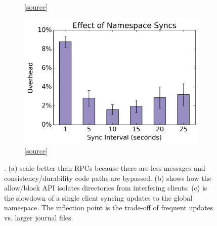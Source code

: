 \begin{figure}[tb]
\begin{subfigure}[b]{.3\linewidth}
      \caption{
      [\href{https://github.com/michaelsevilla/cudele-popper/blob/master/experiments/cudele-blockapi/visualize/viz.ipynb}{source}]
      }\label{fig:block-allow}
  \end{subfigure}
  \begin{subfigure}[b]{.3\linewidth}
      \centering
      \includegraphics[width=1.0\linewidth]{./chapters/cudele/figures/slowdown-sync.png}
      \caption{
      [\href{https://github.com/michaelsevilla/cudele-popper/blob/master/experiments/cudele-partialreads/visualize/viz.ipynb}{source}]
      }\label{fig:slowdown-sync}
  \end{subfigure}
\caption{. (a)  scale better than RPCs because there
are less messages and consistency/durability code paths are bypassed. (b) shows
how the allow/block API isolates directories from interfering clients. (c) is
the slowdown of a single client syncing updates to the global namespace. The
inflection point is the trade-off of frequent updates vs. larger journal
files.}
\label{fig:use-cases}
\end{figure}

